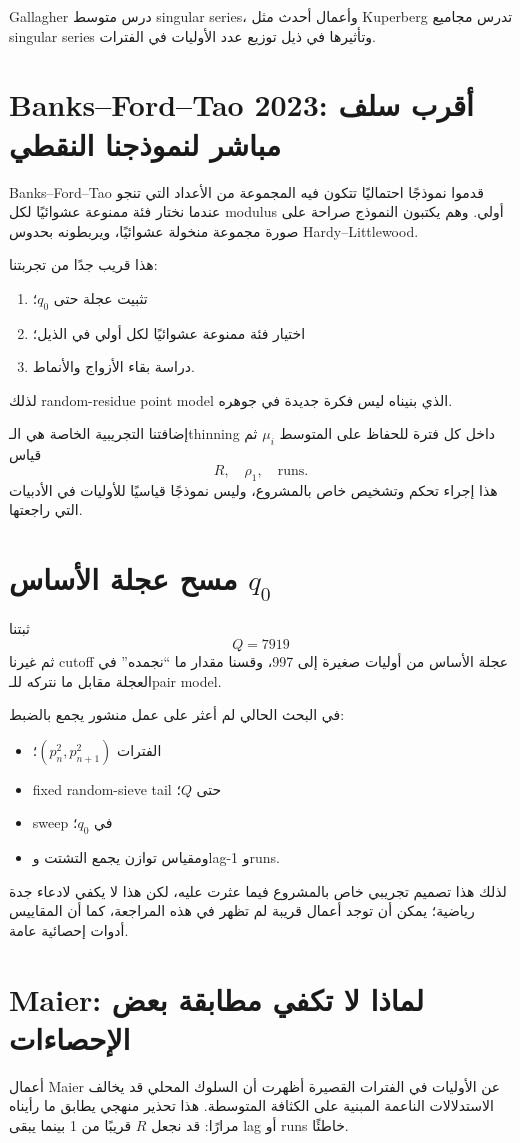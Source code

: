 \documentclass[12pt]{article}
\begin{document}
Gallagher درس متوسط singular series، وأعمال أحدث مثل Kuperberg تدرس مجاميع singular series وتأثيرها في ذيل توزيع عدد الأوليات في الفترات.

\section{Banks--Ford--Tao 2023: أقرب سلف مباشر لنموذجنا النقطي}
Banks--Ford--Tao قدموا نموذجًا احتماليًا تتكون فيه المجموعة من الأعداد التي تنجو عندما نختار فئة ممنوعة عشوائيًا لكل modulus أولي. وهم يكتبون النموذج صراحة على صورة مجموعة منخولة عشوائيًا، ويربطونه بحدوس Hardy--Littlewood.

هذا قريب جدًا من تجربتنا:
\begin{enumerate}
\item تثبيت عجلة حتى $q_0$؛
\item اختيار فئة ممنوعة عشوائيًا لكل أولي في الذيل؛
\item دراسة بقاء الأزواج والأنماط.
\end{enumerate}
لذلك random-residue point model الذي بنيناه ليس فكرة جديدة في جوهره.

إضافتنا التجريبية الخاصة هي الـthinning داخل كل فترة للحفاظ على المتوسط $\mu_i$ ثم قياس
\[
R,\quad \rho_1,\quad \text{runs}.
\]
هذا إجراء تحكم وتشخيص خاص بالمشروع، وليس نموذجًا قياسيًا للأوليات في الأدبيات التي راجعتها.

\section{مسح عجلة الأساس $q_0$}
ثبتنا
\[
Q=7919
\]
ثم غيرنا cutoff عجلة الأساس من أوليات صغيرة إلى 997، وقسنا مقدار ما ``نجمده'' في العجلة مقابل ما نتركه للـpair model.

في البحث الحالي لم أعثر على عمل منشور يجمع بالضبط:
\begin{itemize}
\item الفترات $(p_n^2,p_{n+1}^2)$؛
\item fixed random-sieve tail حتى $Q$؛
\item sweep في $q_0$؛
\item ومقياس توازن يجمع التشتت وlag-1 وruns.
\end{itemize}
لذلك هذا تصميم تجريبي خاص بالمشروع فيما عثرت عليه، لكن هذا لا يكفي لادعاء جدة رياضية؛ يمكن أن توجد أعمال قريبة لم تظهر في هذه المراجعة، كما أن المقاييس أدوات إحصائية عامة.

\section{Maier: لماذا لا تكفي مطابقة بعض الإحصاءات}
أعمال Maier عن الأوليات في الفترات القصيرة أظهرت أن السلوك المحلي قد يخالف الاستدلالات الناعمة المبنية على الكثافة المتوسطة. هذا تحذير منهجي يطابق ما رأيناه مرارًا: قد نجعل $R$ قريبًا من 1 بينما يبقى lag أو runs خاطئًا.
\end{document}
